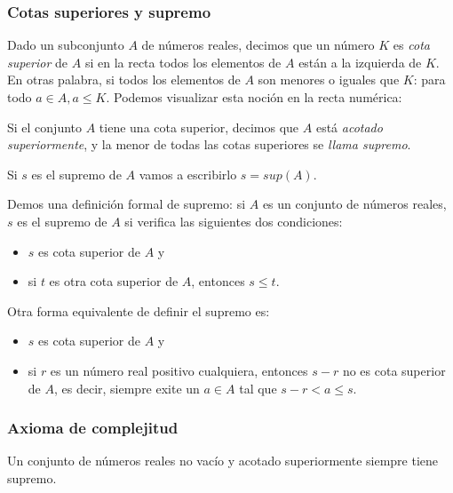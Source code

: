 \documentclass[../Teoría.root.tex]{subfiles}
\begin{document}
\subsubsection{Cotas superiores y supremo}
Dado un subconjunto \(A\) de números reales, decimos que un número \(K\) es \textit{cota superior} de \(A\) si en la recta todos los elementos de \(A\) están a la izquierda de \(K\).
En otras palabra, si todos los elementos de \(A\) son menores o iguales que \(K\):
para todo \(a \in A, a \leq K\).
Podemos visualizar esta noción en la recta numérica:
\begin{center}
    \begin{scaletikzpicturetowidth}{0.5\linewidth}
    \end{scaletikzpicturetowidth}
\end{center}
Si el conjunto \(A\) tiene una cota superior, decimos que \(A\) está \textit{acotado superiormente}, y la menor de todas las cotas superiores se \textit{llama supremo}.

Si \(s\) es el supremo de \(A\) vamos a escribirlo \(s = sup(A)\).

Demos una definición formal de supremo:
si \(A\) es un conjunto de números reales, \(s\) es el supremo de \(A\) si verifica las siguientes dos condiciones:
\begin{itemize}
    \item \(s\) es cota superior de \(A\) y
    \item si \(t\) es otra cota superior de \(A\), entonces \(s \leq t\).
\end{itemize}
Otra forma equivalente de definir el supremo es:
\begin{itemize}
    \item \(s\) es cota superior de \(A\) y
    \item si \(r\) es un número real positivo cualquiera, entonces \(s - r\) no es cota superior de \(A\), es decir, siempre exite un \(a \in A\) tal que \(s - r < a \leq s\).
\end{itemize}
\subsubsection{Axioma de complejitud}
Un conjunto de números reales no vacío y acotado superiormente siempre tiene supremo.
\end{document}
